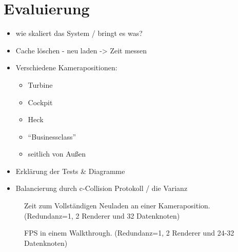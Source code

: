 \chapter{Evaluierung}
\label{chap:eval}
%
\begin{itemize}
 \item wie skaliert das System / bringt es was?
 \item Cache löschen - neu laden -> Zeit messen
 \item Verschiedene Kamerapositionen:
 \begin{itemize}
  \item Turbine
  \item Cockpit
  \item Heck
  \item ``Businessclass''
  \item seitlich von Außen
 \end{itemize}
 \item Erklärung der Tests \& Diagramme
 \item Balancierung durch c-Collision Protokoll / die Varianz
\end{itemize}
%




%

%

\begin{figure}
\centering

  \caption{Zeit zum Vollständigen Neuladen an einer Kameraposition. (Redundanz=1, 2 Renderer und 32 Datenknoten)}
  \label{fig:eval:diag1}
\end{figure}

\begin{figure}
\centering

  \caption{FPS in einem Walkthrough. (Redundanz=1, 2 Renderer und 24-32 Datenknoten)}
  \label{fig:eval:diag1}
\end{figure}

